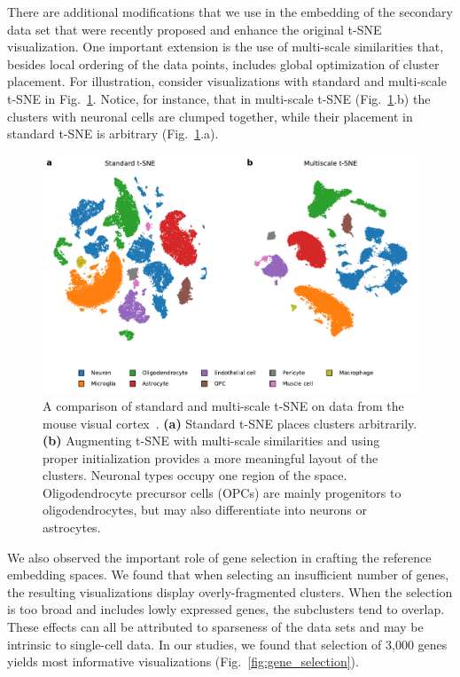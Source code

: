 \documentclass[runningheads]{llncs}
\begin{document}
There are additional modifications that we use in the embedding of the
secondary data set that were recently proposed and enhance the original t-SNE visualization.
One important extension is the use of multi-scale similarities that, besides local ordering of the
data points, includes global optimization of cluster placement. For
illustration, consider visualizations with standard and multi-scale t-SNE in
Fig.~\ref{fig:multiscale}. Notice, for instance, that in multi-scale t-SNE
(Fig.~\ref{fig:multiscale}.b) the clusters with neuronal cells are clumped
together, while their placement in standard t-SNE is arbitrary
(Fig.~\ref{fig:multiscale}.a).


\begin{figure}[htbp]
\includegraphics[width=\textwidth]{figures/hrvatin_multiscale_tsne.pdf}
\caption{A comparison of standard and multi-scale t-SNE on data
from the mouse visual cortex~\cite{hrvatin2018}. {\bf (a)} Standard t-SNE
places clusters arbitrarily. {\bf (b)} Augmenting t-SNE with multi-scale
similarities and using proper initialization provides a more meaningful layout of the clusters. Neuronal types
occupy one region of the space. Oligodendrocyte precursor cells (OPCs) are
mainly progenitors to oligodendrocytes, but may also differentiate into neurons
or astrocytes.} \label{fig:multiscale}
\end{figure}

We also observed the important role of gene selection in crafting the
reference embedding spaces. We found that when selecting an insufficient
number of genes, the resulting visualizations display overly-fragmented clusters. When
the selection is too broad and includes lowly expressed genes, the subclusters
tend to overlap. These effects can all be attributed to sparseness of the data
sets and may be intrinsic to single-cell data. In our studies, we found that
selection of 3,000 genes yields most informative visualizations
(Fig.~\ref{fig:gene_selection}).
\end{document}

